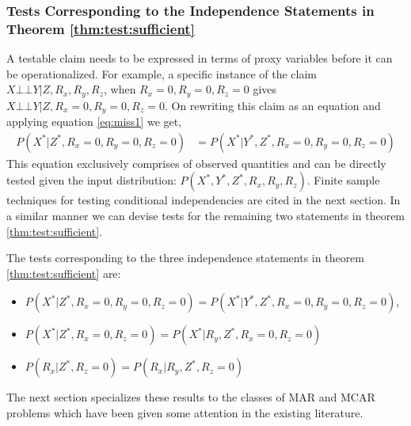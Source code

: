\documentclass[12pt]{article}
\newcommand{\compos}{\mbox{$\bot\!\!\!\bot$}}
\begin{document}
\subsubsection{Tests Corresponding to the Independence Statements in Theorem \ref{thm:test:sufficient} }
A testable claim needs to be expressed in terms of proxy variables before it can be operationalized. For example, a specific instance of the claim
  $X \compos Y | Z, R_x, R_y, R_z$,  
 when $R_x=0, R_y=0,R_z=0$  gives $X \compos Y|Z, R_x=0, R_y=0, R_z=0$. On rewriting this claim as an equation and applying equation \ref{eq:miss1} we get,
	\begin{align*}
	P(X^*|Z^*, R_x=0, R_y=0, R_z=0)&=P(X^*|Y^*,Z^*, R_x=0, R_y=0, R_z=0)
	\end{align*}
	This equation  exclusively comprises of observed quantities and can be directly tested given the input distribution: $P(X^*,Y^*,Z^*,R_x,R_y,R_z)$. Finite sample techniques for testing conditional independencies
	are cited in the next section. In a similar manner we can devise tests for the remaining two statements in theorem \ref{thm:test:sufficient}.%
	
The tests corresponding to the three independence statements in theorem \ref{thm:test:sufficient} are:
\begin{itemize}
	\item $P(X^*|Z^*, R_x=0, R_y=0, R_z=0)=P(X^*|Y^*,Z^*, R_x=0, R_y=0, R_z=0)$,
	\item $P(X^*|Z^*,R_x=0,R_z=0)=P(X^*|R_y,Z^*,R_x=0,R_z=0)$ 
	\item  $P(R_x|Z^*,R_z=0)=P(R_x|R_y,Z^*,R_z=0)$
\end{itemize}
The next section specializes these results to the classes of MAR and MCAR problems which have been given some attention in the existing literature. 
\end{document}
